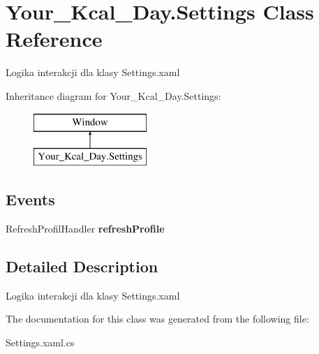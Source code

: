 \hypertarget{class_your___kcal___day_1_1_settings}{}\section{Your\+\_\+\+Kcal\+\_\+\+Day.\+Settings Class Reference}
\label{class_your___kcal___day_1_1_settings}


Logika interakcji dla klasy Settings.\+xaml  


Inheritance diagram for Your\+\_\+\+Kcal\+\_\+\+Day.\+Settings\+:\begin{figure}[H]
\begin{center}
\leavevmode
\includegraphics[height=2.000000cm]{class_your___kcal___day_1_1_settings}
\end{center}
\end{figure}
\subsection*{Events}
\begin{DoxyCompactItemize}
\item 
\mbox{\label{class_your___kcal___day_1_1_settings_a0ebf086bd14a652e1752516c6426a1f4}} 
Refresh\+Profil\+Handler {\bfseries refresh\+Profile}
\end{DoxyCompactItemize}


\subsection{Detailed Description}
Logika interakcji dla klasy Settings.\+xaml 



The documentation for this class was generated from the following file\+:\begin{DoxyCompactItemize}
\item 
Settings.\+xaml.\+cs\end{DoxyCompactItemize}
